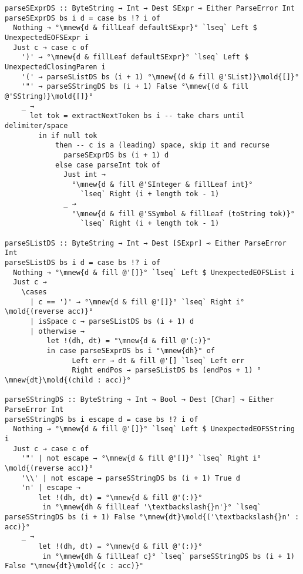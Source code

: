 \documentclass[english]{jflart}
\begin{document}
\begin{verbatim}
parseSExprDS :: ByteString → Int → Dest SExpr ⊸ Either ParseError Int
parseSExprDS bs i d = case bs !? i of
  Nothing → °\mnew{d & fillLeaf defaultSExpr}° `lseq` Left $ UnexpectedEOFSExpr i
  Just c → case c of
    ')' → °\mnew{d & fillLeaf defaultSExpr}° `lseq` Left $ UnexpectedClosingParen i
    '(' → parseSListDS bs (i + 1) °\mnew{(d & fill @'SList)}\mold{[]}°
    '"' → parseSStringDS bs (i + 1) False °\mnew{(d & fill @'SString)}\mold{[]}°
    _ →
      let tok = extractNextToken bs i -- take chars until delimiter/space
        in if null tok
            then -- c is a (leading) space, skip it and recurse
              parseSExprDS bs (i + 1) d
            else case parseInt tok of
              Just int →
                °\mnew{d & fill @'SInteger & fillLeaf int}°
                  `lseq` Right (i + length tok - 1)
              _ →
                °\mnew{d & fill @'SSymbol & fillLeaf (toString tok)}°
                  `lseq` Right (i + length tok - 1)

parseSListDS :: ByteString → Int → Dest [SExpr] ⊸ Either ParseError Int
parseSListDS bs i d = case bs !? i of
  Nothing → °\mnew{d & fill @'[]}° `lseq` Left $ UnexpectedEOFSList i
  Just c →
    \cases
      | c == ')' → °\mnew{d & fill @'[]}° `lseq` Right i°\mold{(reverse acc)}°
      | isSpace c → parseSListDS bs (i + 1) d
      | otherwise →
          let !(dh, dt) = °\mnew{d & fill @'(:)}°
          in case parseSExprDS bs i °\mnew{dh}° of
                Left err → dt & fill @'[] `lseq` Left err
                Right endPos → parseSListDS bs (endPos + 1) °\mnew{dt}\mold{(child : acc)}°

parseSStringDS :: ByteString → Int → Bool → Dest [Char] ⊸ Either ParseError Int
parseSStringDS bs i escape d = case bs !? i of
  Nothing → °\mnew{d & fill @'[]}° `lseq` Left $ UnexpectedEOFSString i
  Just c → case c of
    '"' | not escape → °\mnew{d & fill @'[]}° `lseq` Right i°\mold{(reverse acc)}°
    '\\' | not escape → parseSStringDS bs (i + 1) True d
    'n' | escape →
        let !(dh, dt) = °\mnew{d & fill @'(:)}°
         in °\mnew{dh & fillLeaf '\textbackslash{}n'}° `lseq` parseSStringDS bs (i + 1) False °\mnew{dt}\mold{('\textbackslash{}n' : acc)}°
    _ →
        let !(dh, dt) = °\mnew{d & fill @'(:)}°
         in °\mnew{dh & fillLeaf c}° `lseq` parseSStringDS bs (i + 1) False °\mnew{dt}\mold{(c : acc)}°
\end{verbatim}
\end{document}
